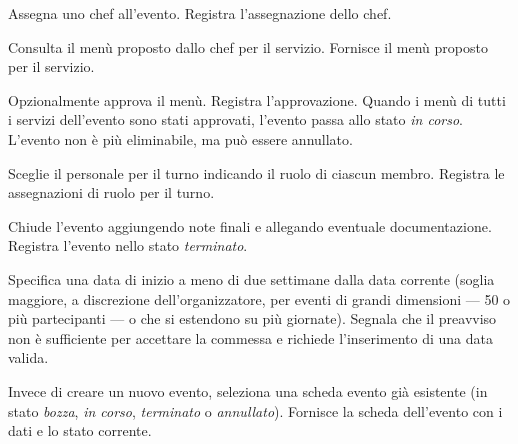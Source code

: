 
    {Assegna uno chef all'evento.}
    {Registra l'assegnazione dello chef.}

    {Consulta il menù proposto dallo chef per il servizio.}
    {Fornisce il menù proposto per il servizio.}

    {Opzionalmente approva il menù.}
    {Registra l'approvazione. Quando i menù di tutti i servizi
     dell'evento sono stati approvati, l'evento passa allo stato
     \emph{in corso}. L'evento non è più eliminabile, ma può essere
     annullato.}


    {Sceglie il personale per il turno indicando il ruolo
     di ciascun membro.}
    {Registra le assegnazioni di ruolo per il turno.}


    {Chiude l'evento aggiungendo note finali e allegando eventuale
     documentazione.}
    {Registra l'evento nello stato \emph{terminato}.}

\uctableend


\uctablebegin
    {Specifica una data di inizio a meno di due settimane dalla data
     corrente (soglia maggiore, a discrezione dell'organizzatore, per
     eventi di grandi dimensioni --- 50 o più partecipanti --- o che
     si estendono su più giornate).}
    {Segnala che il preavviso non è sufficiente per accettare la
     commessa e richiede l'inserimento di una data valida.}
\uctableend


\uctablebegin
    {Invece di creare un nuovo evento, seleziona una scheda evento già
     esistente (in stato \emph{bozza}, \emph{in corso}, \emph{terminato}
     o \emph{annullato}).}
    {Fornisce la scheda dell'evento con i dati e lo stato corrente.}
\uctableend

